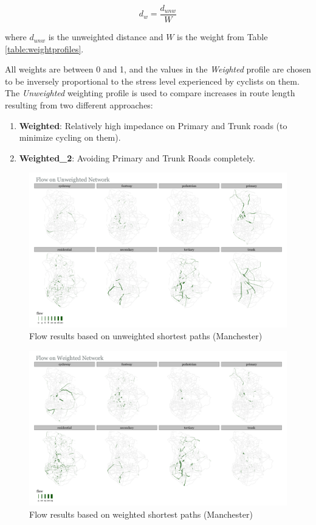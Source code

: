 \documentclass[
]{article}
\providecommand{\tightlist}{%
  \setlength{\itemsep}{0pt}\setlength{\parskip}{0pt}}
\begin{document}
\begin{equation}\label{eq:weight_distance}
    d_{w} = \frac{d_{unw}}{W}
\end{equation}

\noindent where \(d_{unw}\) is the unweighted distance and
\(W\) is the weight from Table \ref{table:weightprofiles}.

All weights are between 0 and 1, and the values in the
\textit{Weighted} profile are chosen to be inversely proportional to
the stress level experienced by cyclists on them. The
\textit{Unweighted} weighting profile is used to compare increases in
route length resulting from two different approaches:

\begin{enumerate}
\def\labelenumi{\arabic{enumi}.}
\tightlist
\item
  \textbf{Weighted}: Relatively high impedance on Primary and Trunk roads
  (to minimize cycling on them).
\item
  \textbf{Weighted\_2}: Avoiding Primary and Trunk Roads completely.
\end{enumerate}

\begin{figure}
\includegraphics[width=0.9\linewidth]{data/Manchester/Plots/flows_facet_unweighted_Manchester} \caption{Flow results based on unweighted shortest paths (Manchester)}\label{fig:flowsfacetunweighted}
\end{figure}

\begin{figure}
\includegraphics[width=0.9\linewidth]{data/Manchester/Plots/flows_facet_weighted_Manchester} \caption{Flow results based on weighted shortest paths (Manchester)}\label{fig:flowsfacetweighted}
\end{figure}
\end{document}
